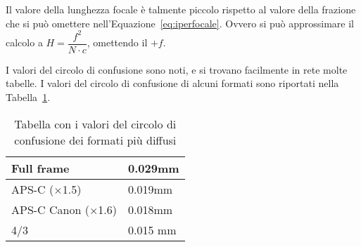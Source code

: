 \nb Il valore della lunghezza focale è talmente piccolo rispetto al valore della frazione che si può omettere nell'Equazione~\ref{eq:iperfocale}. Ovvero si può approssimare il calcolo a $H = \dfrac{f^2}{N \cdot c}$, omettendo il $+f$.

I valori del circolo di confusione sono noti, e si trovano facilmente in rete molte tabelle.
I valori del circolo di confusione di alcuni formati sono riportati nella Tabella~\ref{tab:circoli_confusione}.

\begin{table}[h]
    \centering
    \begin{tabular}{|l|l|}
        \hline
        Full frame                & 0.029mm  \\ \hline
        APS-C ($\times$1.5)       & 0.019mm  \\ \hline
        APS-C Canon ($\times$1.6) & 0.018mm  \\ \hline
        4/3                       & 0.015 mm \\ \hline
    \end{tabular}
    \caption{Tabella con i valori del circolo di confusione dei formati più diffusi}
    \label{tab:circoli_confusione}
\end{table}
